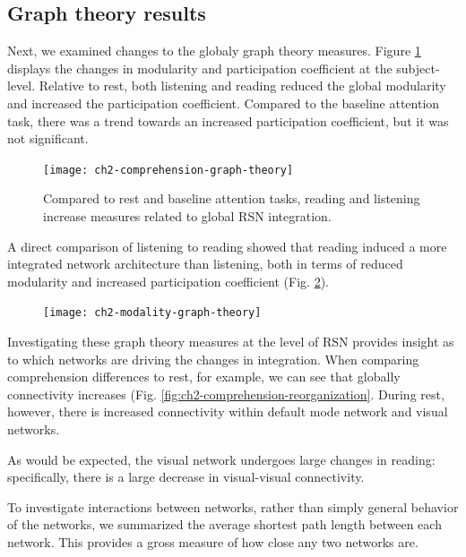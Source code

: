 \subsection{Graph theory results}

Next, we examined changes to the globaly graph theory measures. Figure \ref{fig:ch2-comprehension-graph-theory} displays the changes in modularity and participation coefficient at the subject-level. Relative to rest, both listening and reading reduced the global modularity and increased the participation coefficient. Compared to the baseline attention task, there was  a trend towards an increased participation coefficient, but it was not significant. 

\begin{figure}[t]
	\centering
	\texttt{[image: ch2-comprehension-graph-theory]}
    \caption[Language induces more integrated global network architecture.]{Compared to rest and baseline attention tasks, reading and listening increase measures related to global RSN integration.}
	\label{fig:ch2-comprehension-graph-theory}
\end{figure}

A direct comparison of listening to reading showed that reading induced a more integrated network architecture than listening, both in terms of reduced modularity and increased participation coefficient (Fig. \ref{fig:ch2-modality-graph-theory}).

\begin{figure}[t]
	\centering
	\texttt{[image: ch2-modality-graph-theory]}
    \caption[Reading is more integrated than listening.]{}
	\label{fig:ch2-modality-graph-theory}
\end{figure}

Investigating these graph theory measures at the level of RSN provides  insight as to which networks are driving the changes in integration. When comparing comprehension differences to rest, for example, we can see that globally connectivity increases (Fig. \ref{fig:ch2-comprehension-reorganization}. During rest, however, there is increased connectivity within default mode network and visual networks.

As would be expected, the visual network undergoes large changes in reading: specifically, there is a large decrease in visual-visual connectivity. 

To investigate interactions between networks, rather than simply general behavior of the networks, we summarized the average shortest path length between each network. This provides a gross measure of how close any two networks are. 

